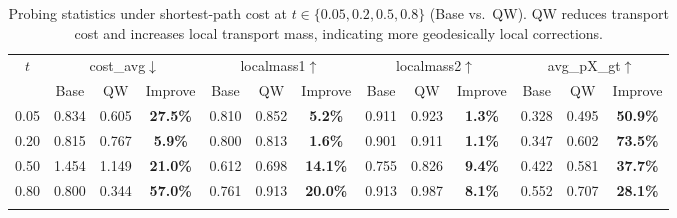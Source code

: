 \begin{table}[t]
\centering
\caption{Probing statistics under shortest-path cost at $t\in\{0.05,0.2,0.5,0.8\}$ (Base vs.\ QW). QW reduces transport cost and increases local transport mass, indicating more geodesically local corrections.}
\renewcommand\arraystretch{1.15}
\begin{tabular*}{\textwidth}{@{\extracolsep{\fill}}c|ccc|ccc|ccc|ccc@{\extracolsep{\fill}}}
\toprule
\multirow{2}{*}{$t$} &
\multicolumn{3}{c|}{cost\_avg$\downarrow$} &
\multicolumn{3}{c|}{localmass1$\uparrow$} &
\multicolumn{3}{c|}{localmass2$\uparrow$} &
\multicolumn{3}{c}{avg\_pX\_gt$\uparrow$} \\
\cmidrule(lr){2-4}\cmidrule(lr){5-7}\cmidrule(lr){8-10}\cmidrule(lr){11-13}
& Base & QW & Improve & Base & QW & Improve & Base & QW & Improve & Base & QW & Improve \\
\midrule
0.05 & 0.834 & 0.605 & \textbf{27.5\%} & 0.810 & 0.852 & \textbf{5.2\%} & 0.911 & 0.923 & \textbf{1.3\%} & 0.328 & 0.495 & \textbf{50.9\%} \\
0.20 & 0.815 & 0.767 & \textbf{5.9\%}  & 0.800 & 0.813 & \textbf{1.6\%} & 0.901 & 0.911 & \textbf{1.1\%} & 0.347 & 0.602 & \textbf{73.5\%} \\
0.50 & 1.454 & 1.149 & \textbf{21.0\%} & 0.612 & 0.698 & \textbf{14.1\%} & 0.755 & 0.826 & \textbf{9.4\%} & 0.422 & 0.581 & \textbf{37.7\%} \\
0.80 & 0.800 & 0.344 & \textbf{57.0\%} & 0.761 & 0.913 & \textbf{20.0\%} & 0.913 & 0.987 & \textbf{8.1\%} & 0.552 & 0.707 & \textbf{28.1\%} \\
\botrule
\end{tabular*}
\label{tab:probing_short}
\end{table}

